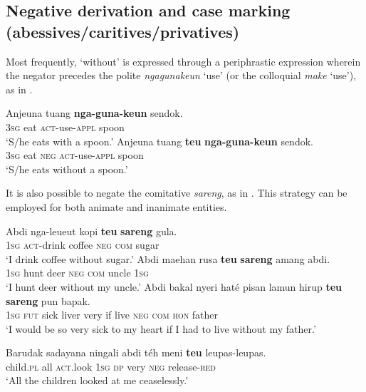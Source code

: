 \documentclass[output=paper]{langscibook}
\begin{document}
\subsection{Negative derivation and case marking (abessives/caritives/privatives)} \label{sec:sun:3.3}

Most frequently, ‘without’ is expressed through a periphrastic expression where\-in the negator precedes the polite \textit{ngagunakeun} ‘use’ (or the colloquial \textit{make} ‘use’), as in .

\ea\label{ex:sun:44}
    \ea\label{ex:sun:44a}
        \gll Anjeuna tuang \textbf{nga-guna-keun} sendok. \\ 
                3\textsc{sg} eat \textsc{act}{}-use-\textsc{appl} spoon\\
        \glt ‘S/he eats with a spoon.’
    \ex\label{ex:sun:44b}
        \gll  Anjeuna tuang \textbf{teu} \textbf{nga-guna-keun} sendok.\\
             3\textsc{sg} eat \textsc{neg} \textsc{act}{}-use-\textsc{appl} spoon\\
        \glt ‘S/he eats without a spoon.’
    \z
\z 

It is also possible to negate the comitative \textit{sareng}, as in . This strategy can be employed for both animate and inanimate entities.

 \ea\label{ex:sun:45}
    \ea\label{ex:sun:45a}
        \gll  Abdi nga-leueut kopi \textbf{teu} \textbf{sareng} gula.\\ 
              1\textsc{sg} \textsc{act}{}-drink coffee \textsc{neg} \textsc{com} sugar\\
        \glt ‘I drink coffee without sugar.’
    \ex\label{ex:sun:45b}
        \gll  Abdi maehan rusa \textbf{teu} \textbf{sareng} amang abdi.\\
              1\textsc{sg} hunt deer \textsc{neg} \textsc{com} uncle 1\textsc{sg}\\
        \glt ‘I hunt deer without my uncle.’
    \ex\label{ex:sun:45c}
        \gll  Abdi bakal nyeri haté pisan lamun hirup \textbf{teu} \textbf{sareng} pun bapak. \\
              1\textsc{sg} \textsc{fut} sick liver very if live \textsc{neg} \textsc{com} \textsc{hon} father\\
        \glt ‘I would be so very sick to my heart if I had to live without my father.’
    \z
\z

\ea\label{ex:sun:46} 
    \gll  Barudak sadayana ningali abdi téh meni \textbf{teu} leupas-leupas. \\ 
          child.\textsc{pl} all \textsc{act}.look 1\textsc{sg} \textsc{dp} very \textsc{neg} release{}-\textsc{red}  \\
    \glt ‘All the children looked at me ceaselessly.’
\z
\end{document}
